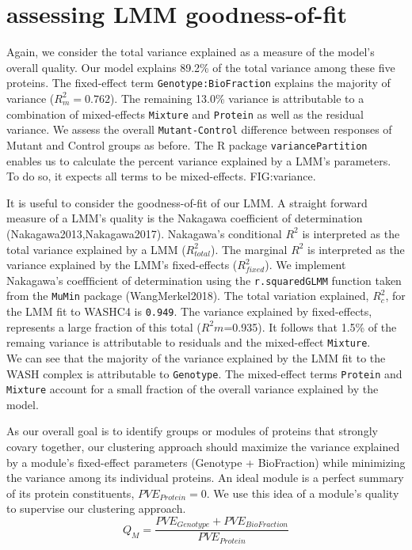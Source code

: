 \documentclass[11pt]{elife}\usepackage[]{graphicx}\usepackage[]{color}
\begin{document}
\section{assessing LMM goodness-of-fit}

Again, we consider the total variance explained as a measure of the model's
overall quality. Our model explains 89.2\% of the total variance among these
five proteins. The fixed-effect term \texttt{Genotype:BioFraction} explains the
majority of variance ($R^2_m=0.762$). The remaining 13.0\% variance is
attributable to a combination of mixed-effects \texttt{Mixture} and
\texttt{Protein} as well as the residual variance. We assess the overall
\texttt{Mutant-Control} difference between responses of Mutant and Control
groups as before. The R package \texttt{variancePartition} enables us to
calculate the percent variance explained by a LMM's parameters. To do so, it
expects all terms to be mixed-effects. FIG:variance.

It is useful to consider the goodness-of-fit of our LMM. A straight forward
measure of a LMM's quality is the Nakagawa coefficient of 
determination (Nakagawa2013,Nakagawa2017). Nakagawa's conditional $R^2$ is 
interpreted as the total variance explained by a LMM ($R^2_{total}$).
The marginal $R^2$ is interpreted as the variance explained by the LMM's 
fixed-effects ($R^2_{fixed}$). We implement Nakagawa's coeffficient of 
determination using the \texttt{r.squaredGLMM} function taken from the 
\texttt{MuMin} package (WangMerkel2018).
The total variation explained, $R^2_{c}$, for the LMM fit to WASHC4 is 
\texttt{0.949}. The variance explained by fixed-effects, represents a large
fraction of this total ($R^2{m}$=0.935). It follows that 1.5\% of the remaing
variance is attributable to residuals and the mixed-effect \texttt{Mixture}.\\

We can see that the majority of the variance explained by the LMM fit to the
WASH complex is attributable to \texttt{Genotype}. The mixed-effect terms
\texttt{Protein} and \texttt{Mixture} account for a small fraction of the 
overall variance explained by the model.

As our overall goal is to identify groups or modules of proteins that strongly
covary together, our clustering approach should maximize the variance explained
by a module's fixed-effect parameters (Genotype + BioFraction) while minimizing 
the variance among its individual proteins. 
An ideal module is a perfect summary of its protein constituents, 
$PVE_{Protein}=0$. We use this idea of a module's quality to supervise our 
clustering approach.
\begin{equation}
	Q_{M}=\frac{PVE_{Genotype} + PVE_{BioFraction}}{PVE_{Protein}}
\end{equation}
\end{document}
